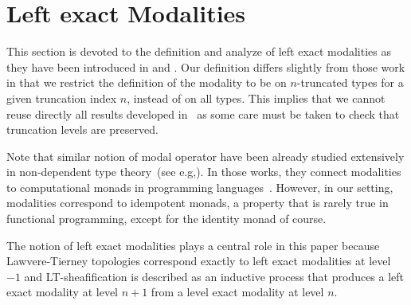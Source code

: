 \documentclass[preprint,9pt,numbers]{sigplanconf}
\newtheorem{thm}{Theorem}
\newcommand{\eg}{e.g,\xspace}
\begin{document}




\section{Left exact Modalities}
\label{sec:lexmod}

This section is devoted to the definition and analyze of left exact
modalities as they have been introduced in \cite{hottbook} and
\cite{shulman-higher-modalities}. Our definition differs slightly from
those work in that we restrict the definition of the modality to be on
$n$-truncated types for a given truncation index $n$, instead of on
all types.
%
This implies that we cannot reuse directly all results developed
in~\cite{hottbook} as some care must be taken to check that truncation
levels are preserved.

Note that similar notion of modal operator have been already studied
extensively in non-dependent type
theory~(see \eg \cite{benton1998computational}). In those works, they connect
modalities to computational monads in programming
languages~\cite{moggi-monad}. However, in our setting, modalities
correspond to idempotent monads, a property that is rarely true 
in functional programming, except for the identity monad of course.

The notion of left exact modalities plays a central role in this paper
because Lawvere-Tierney topologies correspond exactly to left exact
modalities at level $-1$ and LT-sheafification is described as an inductive
process that produces a left exact modality at level $n+1$ from a
level exact modality at level $n$. 

\end{document}

